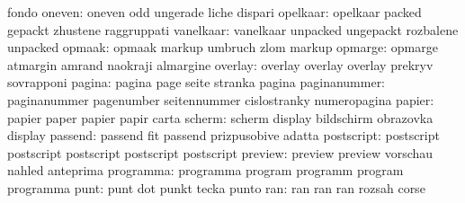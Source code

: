                            fondo
                   oneven: oneven                    odd
                           ungerade                  liche
                           dispari
                 opelkaar: opelkaar                  packed
                           gepackt                   zhustene
                           raggruppati
                vanelkaar: vanelkaar                 unpacked
                           ungepackt                 rozbalene
                           unpacked                  %
                   opmaak: opmaak                    markup
                           umbruch                   zlom
                           markup                    %
                  opmarge: opmarge                   atmargin
                           amrand                    naokraji
                           almargine
                  overlay: overlay                   overlay
                           overlay                   prekryv
                           sovrapponi
                   pagina: pagina                    page
                           seite                     stranka
                           pagina
             paginanummer: paginanummer              pagenumber
                           seitennummer              cislostranky
                           numeropagina
                   papier: papier                    paper
                           papier                    papir
                           carta
                   scherm: scherm                    display
                           bildschirm                obrazovka
                           display                   %
                  passend: passend                   fit
                           passend                   prizpusobive
                           adatta
               postscript: postscript                postscript
                           postscript                postscript
                           postscript
                  preview: preview                   preview
                           vorschau                  nahled
                           anteprima
                programma: programma                 program
                           programm                  program
                           programma
                     punt: punt                      dot
                           punkt                     tecka
                           punto
                      ran: ran                       ran
                           ran                       rozsah
                           corse
